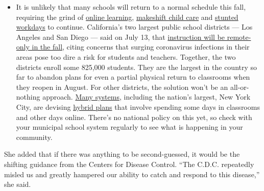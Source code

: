 \begin{itemize}
  \begin{itemize}
  \tightlist
  \item
    It is unlikely that many schools will return to a normal schedule
    this fall, requiring the grind of
    \href{https://www.nytimes3xbfgragh.onion/2020/06/05/us/coronavirus-education-lost-learning.html?action=click\&pgtype=Article\&state=default\&region=MAIN_CONTENT_3\&context=storylines_faq}{online
    learning},
    \href{https://www.nytimes3xbfgragh.onion/2020/05/29/us/coronavirus-child-care-centers.html?action=click\&pgtype=Article\&state=default\&region=MAIN_CONTENT_3\&context=storylines_faq}{makeshift
    child care} and
    \href{https://www.nytimes3xbfgragh.onion/2020/06/03/business/economy/coronavirus-working-women.html?action=click\&pgtype=Article\&state=default\&region=MAIN_CONTENT_3\&context=storylines_faq}{stunted
    workdays} to continue. California's two largest public school
    districts --- Los Angeles and San Diego --- said on July 13, that
    \href{https://www.nytimes3xbfgragh.onion/2020/07/13/us/lausd-san-diego-school-reopening.html?action=click\&pgtype=Article\&state=default\&region=MAIN_CONTENT_3\&context=storylines_faq}{instruction
    will be remote-only in the fall}, citing concerns that surging
    coronavirus infections in their areas pose too dire a risk for
    students and teachers. Together, the two districts enroll some
    825,000 students. They are the largest in the country so far to
    abandon plans for even a partial physical return to classrooms when
    they reopen in August. For other districts, the solution won't be an
    all-or-nothing approach.
    \href{https://bioethics.jhu.edu/research-and-outreach/projects/eschool-initiative/school-policy-tracker/}{Many
    systems}, including the nation's largest, New York City, are
    devising
    \href{https://www.nytimes3xbfgragh.onion/2020/06/26/us/coronavirus-schools-reopen-fall.html?action=click\&pgtype=Article\&state=default\&region=MAIN_CONTENT_3\&context=storylines_faq}{hybrid
    plans} that involve spending some days in classrooms and other days
    online. There's no national policy on this yet, so check with your
    municipal school system regularly to see what is happening in your
    community.
  \end{itemize}
\end{itemize}

She added that if there was anything to be second-guessed, it would be
the shifting guidance from the Centers for Disease Control. ``The C.D.C.
repeatedly misled us and greatly hampered our ability to catch and
respond to this disease,'' she said.

